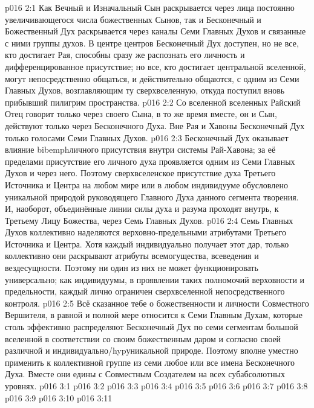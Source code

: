 \vs p016 2:1 Как Вечный и Изначальный Сын раскрывается через лица постоянно увеличивающегося числа божественных Сынов, так и Бесконечный и Божественный Дух раскрывается через каналы Семи Главных Духов и связанные с ними группы духов. В центре центров Бесконечный Дух доступен, но не все, кто достигает Рая, способны сразу же распознать его личность и дифференцированное присутствие; но все, кто достигает центральной вселенной, могут непосредственно общаться, и действительно общаются, с одним из Семи Главных Духов, возглавляющим ту сверхвселенную, откуда поступил вновь прибывший пилигрим пространства.
\vs p016 2:2 Со вселенной вселенных Райский Отец говорит только через своего Сына, в то же время вместе, он и Сын, действуют только через Бесконечного Духа. Вне Рая и Хавоны Бесконечный Дух  только голосами Семи Главных Духов.
\vs p016 2:3 \pc Бесконечный Дух оказывает влияние bibemph{личного присутствия} внутри системы Рай\hyp{}Хавона; за её пределами присутствие его личного духа проявляется одним из Семи Главных Духов и через него. Поэтому сверхвселенское присутствие духа Третьего Источника и Центра на любом мире или в любом индивидууме обусловлено уникальной природой руководящего Главного Духа данного сегмента творения. И, наоборот, объединённые линии силы духа и разума проходят внутрь, к Третьему Лицу Божества, через Семь Главных Духов.
\vs p016 2:4 \pc Семь Главных Духов коллективно наделяются верховно\hyp{}предельными атрибутами Третьего Источника и Центра. Хотя каждый индивидуально получает этот дар, только коллективно они раскрывают атрибуты всемогущества, всеведения и вездесущности. Поэтому ни один из них не может функционировать универсально; как индивидуумы, в проявлении таких полномочий верховности и предельности, каждый лично ограничен сверхвселенной непосредственного контроля.
\vs p016 2:5 Всё сказанное тебе о божественности и личности Совместного Вершителя, в равной и полной мере относится к Семи Главным Духам, которые столь эффективно распределяют Бесконечный Дух по семи сегментам большой вселенной в соответствии со своим божественным даром и согласно своей различной и индивидуально/hyp{}уникальной природе. Поэтому вполне уместно применить к коллективной группе из семи любое или все имена Бесконечного Духа. Вместе они едины с Совместным Создателем на всех субабсолютных уровнях.
\vs p016 3:1 
\vs p016 3:2 
\vs p016 3:3 
\vs p016 3:4 \pc 
\vs p016 3:5 
\vs p016 3:6 \pc 
\vs p016 3:7 
\vs p016 3:8 \pc 
\vs p016 3:9 
\vs p016 3:10 \pc 
\vs p016 3:11 
